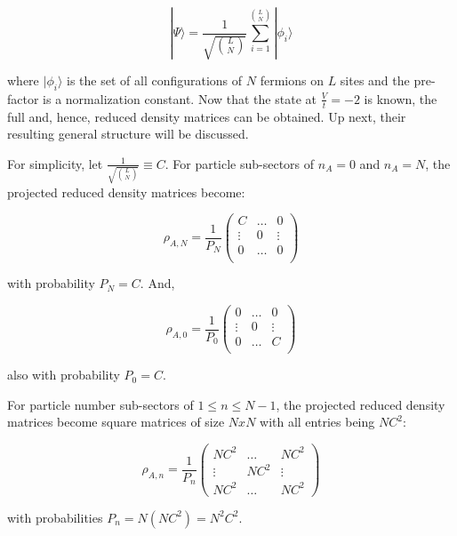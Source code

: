 \begin{equation} 
|\Psi \rangle = \frac{1}{\sqrt{{L}\choose{N}}} \sum_{i=1}^{{L}\choose{N}} | \phi_{i} \rangle
\end{equation}

where $|\phi_{i}\rangle$ is the set of all configurations of $N$ fermions on $L$ sites and the pre-factor is a normalization constant. Now that the state at $\frac{V}{t}=-2$ is known, the full and, hence, reduced density matrices can be obtained. Up next, their resulting general structure will be discussed.

For simplicity, let $\frac{1}{\sqrt{{L}\choose{N}}} \equiv C$. For particle sub-sectors of $n_A = 0$ and $n_A = N$, the projected reduced density matrices become:

\begin{equation}
\rho_{A,N} = \frac{1}{P_{N}} \begin{pmatrix}
C & \dots & 0 \\ 
\vdots & 0 & \vdots \\
0 & \dots & 0 \\
\end{pmatrix}
\end{equation}

with probability $P_{N} = C$. And, 

\begin{equation}
\rho_{A,0} = \frac{1}{P_{0}} \begin{pmatrix}
0 & \dots & 0 \\ 
\vdots & 0 & \vdots \\
0 & \dots & C \\
\end{pmatrix}
\end{equation}

also with probability $P_{0} = C$.

For particle number sub-sectors of $1 \leq n \leq N-1$, the projected reduced density matrices become square matrices of size $NxN$ with all entries being $NC^2$:

\begin{equation}
\rho_{A,n} = \frac{1}{P_{n}} \begin{pmatrix}
NC^2 & \dots & NC^2 \\ 
\vdots & NC^2 & \vdots \\
NC^2 & \dots & NC^2
\end{pmatrix}
\end{equation}

with probabilities $P_{n}=N(NC^2)=N^2C^2$.

